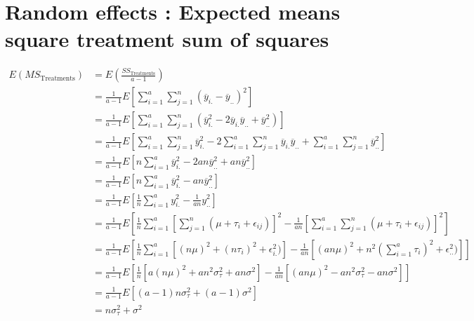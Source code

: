 \documentclass{article}
\begin{document}
\section{Random effects : Expected means square treatment sum of squares}
\begin{equation}
    \begin{split}
        E(MS_{\text{Treatments}}) & = E (\frac{SS_{\text{Treatments}}}{a - 1}) \\ 
        & = \frac{1}{a - 1}E\left[\sum_{i=1}^{a}\sum_{j=1}^{n}(\overline{y}_{i.} - \overline{y}_{..})^2\right] \\
        & = \frac{1}{a - 1}E\left[\sum_{i=1}^{a}\sum_{j=1}^{n} (\overline{y}_{i.}^2 - 2\overline{y}_{i.}\overline{y}_{..} + \overline{y}_{..}^{2})\right]\\
        & = \frac{1}{a - 1}E\left[\sum_{i=1}^{a}\sum_{j=1}^{n}\overline{y}_{i.}^2 - 2\sum_{i=1}^{a}\sum_{j=1}^{n}\overline{y}_{i.}\overline{y}_{..} + \sum_{i=1}^{a}\sum_{j=1}^{n}\overline{y}_{..}^{2}\right] \\
        & = \frac{1}{a - 1}E\left[n\sum_{i=1}^{a}\overline{y}_{i.}^2 - 2an\overline{y}_{..}^2 + an\overline{y}_{..}^{2}\right] \\
        & = \frac{1}{a - 1}E\left[n\sum_{i=1}^{a}\overline{y}_{i.}^2 - an\overline{y}_{..}^{2}\right] \\
        & = \frac{1}{a - 1}E\left[\frac{1}{n}\sum_{i=1}^{a}y_{i.}^2 - \frac{1}{an}y_{..}^{2}\right] \\
        & =\frac{1}{a - 1}E\left[\frac{1}{n}\sum_{i=1}^{a}\left[\sum_{j=1}^{n}(\mu + \tau_{i} + \epsilon_{ij})\right]^2 - \frac{1}{an}\left[ \sum_{i=1}^{a}\sum_{j=1}^{n}(\mu + \tau_i + \epsilon_{ij})\right]^2\right] \\
        & = \frac{1}{a - 1}E\left[\frac{1}{n}\sum_{i=1}^{a}\left[(n\mu)^2 + (n\tau_{i})^2 + \epsilon_{i.}^2)\right] - \frac{1}{an}\left[ (an\mu)^2 + n^2(\sum_{i=1}^{a}\tau_i)^2 + \epsilon_{..}^2)\right]\right] \\
        & = \frac{1}{a - 1}E\left[\frac{1}{n}\left[a(n\mu)^2 + an^2\sigma^{2}_{\tau} + an\sigma^2\right] - \frac{1}{an}\left[ (an\mu)^2 - an^2\sigma^{2}_{\tau} - an\sigma^2\right]\right]\\
        & = \frac{1}{a - 1}E\left[ (a - 1)n\sigma^{2}_{\tau} + (a - 1)\sigma^2\right]\\
        & =  n\sigma^{2}_{\tau} + \sigma^2
    \end{split}
\end{equation}


\begin{small}

\end{small}
\end{document}
